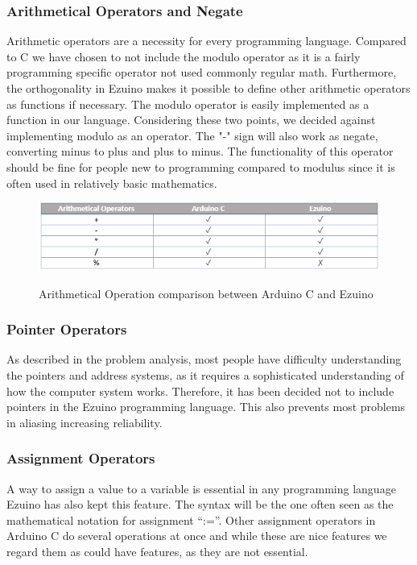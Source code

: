 \subsubsection*{Arithmetical Operators and Negate}
Arithmetic operators are a necessity for every programming language.
Compared to C we have chosen to not include the modulo operator as it is a fairly programming specific operator not used commonly regular math. Furthermore, the orthogonality in Ezuino makes it possible to define other arithmetic operators as functions if necessary. The modulo operator is easily implemented as a function in our language. Considering these two points, we decided against implementing modulo as an operator.
The "-" sign will also work as negate, converting minus to plus and plus to minus. The functionality of this operator should be fine for people new to programming compared to modulus since it is often used in relatively basic mathematics.
\begin{figure}[H]
\centering
\caption{Arithmetical Operation comparison between Arduino C and Ezuino}
\includegraphics[scale=0.80]{figures/language_features/langf05.png}
\label{lf05}
\end{figure}

\subsubsection*{Pointer Operators}
As described in the problem analysis, most people have difficulty understanding the pointers and address systems, as it requires a sophisticated understanding of how the computer system works. Therefore, it has been decided not to include pointers in the Ezuino programming language. This also prevents most problems in aliasing increasing reliability.
\subsubsection*{Assignment Operators}
A way to assign a value to a variable is essential in any programming language Ezuino has also kept this feature. The syntax will be the one often seen as the mathematical notation for assignment “:=”. Other assignment operators in Arduino C do several operations at once and while these are nice features we regard them as could have features, as they are not essential.
